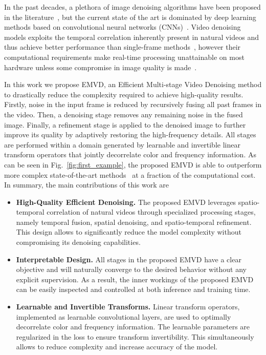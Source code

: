 \documentclass[final]{cvpr}
\begin{document}
    In the past decades, a plethora of image denoising algorithms have been proposed in the literature~\cite{buades2005review,dabov2007bm3d}, but the current state of the art is dominated by deep learning methods based on convolutional neural networks (CNNs)~\cite{zhang2017dncnn,liu2018nlrn,liu2018wcnn}. Video denoising models exploits the temporal correlation inherently present in natural videos and thus achieve better performance than single-frame methods~\cite{maggioni2012vbm4d,arias2018vnlb,mildenhall2018kpn,tassano2020fastdvdnet,yue2020supervised}, however their computational requirements make real-time processing unattainable on most hardware unless some compromise in image quality is made~\cite{ehman2018realtime}.
    
    In this work we propose EMVD, an Efficient Multi-stage Video Denoising method to drastically reduce the complexity required to achieve high-quality results. Firstly, noise in the input frame is reduced by recursively fusing all past frames in the video. Then, a denoising stage removes any remaining noise in the fused image. Finally, a refinement stage is applied to the denoised image to further improve its quality by adaptively restoring the high-frequency details. All stages are performed within a domain generated by learnable and invertible linear transform operators that jointly decorrelate color and frequency information. As can be seen in Fig.~\ref{fig:first_example}, the proposed EMVD is able to outperform more complex state-of-the-art methods~\cite{yue2020supervised} at a fraction of the computational cost. In summary, the main contributions of this work are
    \begin{itemize}
        \item \textbf{High-Quality Efficient Denoising.} 
        The proposed EMVD leverages spatio-temporal correlation of natural videos through specialized processing stages, namely temporal fusion, spatial denoising, and spatio-temporal refinement. This design allows to significantly reduce the model complexity without compromising its denoising capabilities.
        \item \textbf{Interpretable Design.} 
        All stages in the proposed EMVD have a clear objective and will naturally converge to the desired behavior without any explicit supervision. As a result, the inner workings of the proposed EMVD can be easily inspected and controlled at both inference and training time.
        \item \textbf{Learnable and Invertible Transforms.} 
        Linear transform operators, implemented as learnable convolutional layers, are used to optimally decorrelate color and frequency information. The learnable parameters are regularized in the loss to ensure transform invertibility. This simultaneously allows to reduce complexity and increase accuracy of the model.
    \end{itemize}
    
\end{document}
